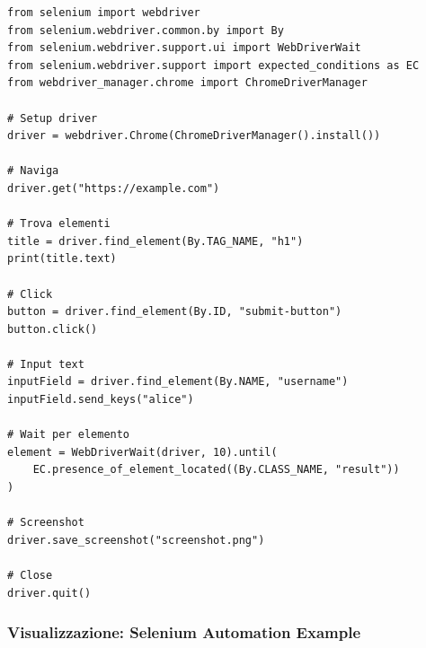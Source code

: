 \begin{lstlisting}
from selenium import webdriver
from selenium.webdriver.common.by import By
from selenium.webdriver.support.ui import WebDriverWait
from selenium.webdriver.support import expected_conditions as EC
from webdriver_manager.chrome import ChromeDriverManager

# Setup driver
driver = webdriver.Chrome(ChromeDriverManager().install())

# Naviga
driver.get("https://example.com")

# Trova elementi
title = driver.find_element(By.TAG_NAME, "h1")
print(title.text)

# Click
button = driver.find_element(By.ID, "submit-button")
button.click()

# Input text
inputField = driver.find_element(By.NAME, "username")
inputField.send_keys("alice")

# Wait per elemento
element = WebDriverWait(driver, 10).until(
    EC.presence_of_element_located((By.CLASS_NAME, "result"))
)

# Screenshot
driver.save_screenshot("screenshot.png")

# Close
driver.quit()
\end{lstlisting}

\subsubsection{Visualizzazione: Selenium Automation Example}

